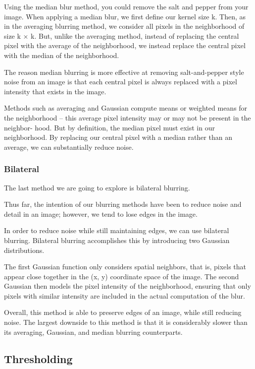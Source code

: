 \documentclass[BTech]{srmuthesis}
\begin{document}
Using the median blur method, you could remove the salt and pepper from your image. When applying a median blur, we first define our kernel size k. Then, as in the averaging blurring method, we consider all pixels in the neighborhood of size k × k. But, unlike the averaging method, instead of replacing the central pixel with the average of the neighborhood, we instead replace the central pixel with the median of the neighborhood.

The reason median blurring is more effective at removing salt-and-pepper style noise from an image is that each central pixel is always replaced with a pixel intensity that exists in the image.

Methods such as averaging and Gaussian compute means or weighted means for the neighborhood – this average pixel intensity may or may not be present in the neighbor- hood. But by definition, the median pixel must exist in our neighborhood. By replacing our central pixel with a median rather than an average, we can substantially reduce noise.

\subsubsection{Bilateral}

The last method we are going to explore is bilateral blurring.

Thus far, the intention of our blurring methods have been to reduce noise and detail in an image; however, we tend to lose edges in the image.

In order to reduce noise while still maintaining edges, we can use bilateral blurring. Bilateral blurring accomplishes this by introducing two Gaussian distributions.

The first Gaussian function only considers spatial neighbors, that is, pixels that appear close together in the (x, y) coordinate space of the image. The second Gaussian then models the pixel intensity of the neighborhood, ensuring that only pixels with similar intensity are included in the actual computation of the blur.

Overall, this method is able to preserve edges of an image, while still reducing noise. The largest downside to this method is that it is considerably slower than its averaging, Gaussian, and median blurring counterparts.

\subsection{Thresholding}
\end{document}
